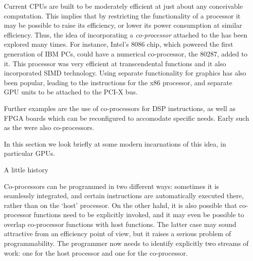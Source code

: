 Current CPUs are built to be moderately efficient at just about any
conceivable computation. This implies that by restricting the
functionality of a processor it may be possible to raise its
efficiency, or lower its power consumption at similar
efficiency. Thus, the idea of incorporating a \emph{co-processor}
attached to the 
has been explored many times. For instance, Intel's 8086 chip, which
powered the first generation of IBM PCs, could have a numerical
co-processor, the 80287, added to it. This processor was very
efficient at transcendental functions and it also incorporated
\ac{SIMD} technology. Using separate functionality for graphics has also
been popular, leading to the  instructions for the x86 processor,
and separate \ac{GPU} units to be attached to the PCI-X bus.

Further examples are the use of co-processors
  for \ac{DSP} instructions, as well as \ac{FPGA} boards which can be
  reconfigured to accomodate specific needs.
Early 
such as the  were also co-processors.

In this section we look briefly at some modern incarnations of this idea,
in particular \acp{GPU}.

 {A little history}

Co-processors can be programmed in two different ways: sometimes 
it is seamlessly integrated, and certain instructions are
automatically executed there, rather than on the `host' processor. On
the other hahd, it is also possible that co-processor functions need
to be explicitly invoked, and it may even be possible to overlap
co-processor functions with host functions. The latter case may sound
attractive from an efficiency point of view, but it raises a serious
problem of programmability. The programmer now needs to identify
explicitly two streams of work: one for the host processor and one for
the co-processor.

